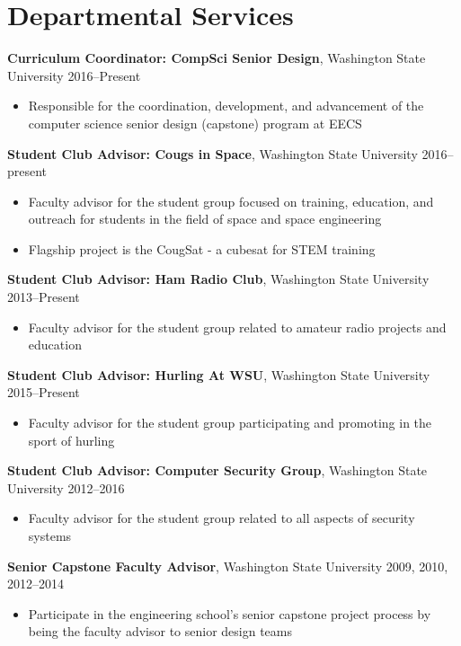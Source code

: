 \AOCLine
\section*{Departmental Services}
\label{sec:departmentservice}

\textbf{Curriculum Coordinator: CompSci Senior Design}, Washington State University \hfill 2016--Present
   \begin{itemize}
		\item{Responsible for the coordination, development, and advancement of the computer science senior design (capstone) program at EECS}
   \end{itemize}

\textbf{Student Club Advisor: Cougs in Space}, Washington State University \hfill 2016--present
   \begin{itemize}
		\item{Faculty advisor for the student group focused on training, education, and outreach for students in the field of space and space engineering}
        \item{Flagship project is the CougSat - a cubesat for STEM training}
   \end{itemize}

\textbf{Student Club Advisor: Ham Radio Club}, Washington State University \hfill 2013--Present
   \begin{itemize}
		\item{Faculty advisor for the student group related to amateur radio projects and education}
   \end{itemize}

\textbf{Student Club Advisor: Hurling At WSU}, Washington State University \hfill 2015--Present
   \begin{itemize}
		\item{Faculty advisor for the student group participating and promoting in the sport of hurling}
   \end{itemize}

\textbf{Student Club Advisor: Computer Security Group}, Washington State University \hfill 2012--2016
   \begin{itemize}
		\item{Faculty advisor for the student group related to all aspects of security systems}
   \end{itemize}

\textbf{Senior Capstone Faculty Advisor}, Washington State University \hfill 2009, 2010, 2012--2014
   \begin{itemize}
		\item{Participate in the engineering school's senior capstone project process by being the faculty advisor to senior design teams}
   \end{itemize}

